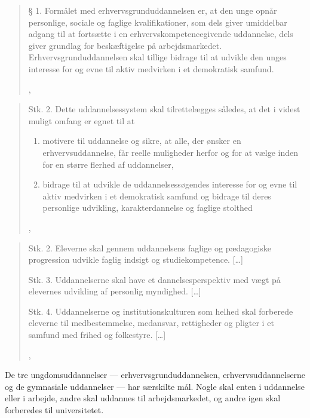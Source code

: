 \blockquote[,  \cite{uddannelsesministerietBekendtgorelseAfLov2016a}]{
§ 1. Formålet med erhvervsgrunduddannelsen er, at den unge opnår personlige, sociale og faglige kvalifikationer, som dels giver umiddelbar adgang til at fortsætte i en erhvervskompetencegivende uddannelse, dels giver grundlag for beskæftigelse på arbejdsmarkedet. 
Erhvervsgrunduddannelsen skal tillige bidrage til at udvikle den unges interesse for og evne til aktiv medvirken i et demokratisk samfund.
}
\blockquote[,  \cite{uddannelsesministerietBekendtgorelseAfLov2020}]{
Stk. 2. Dette uddannelsessystem skal tilrettelægges således, at det i videst muligt omfang er egnet til at
\begin{enumerate}
  \item
    motivere til uddannelse og sikre, at alle, der ønsker en erhvervsuddannelse, får reelle muligheder herfor og for at vælge inden for en større flerhed af uddannelser, \textins[\ldots]

  \item
    bidrage til at udvikle de uddannelsessøgendes interesse for og evne til aktiv medvirken i et demokratisk samfund og bidrage til deres personlige udvikling, karakterdannelse og faglige stolthed \textins[\ldots]
\end{enumerate}
}
\blockquote[, \cite{uddannelsesministerietBekendtgorelseAfLov2019}]{

  Stk. 2. Eleverne skal gennem uddannelsens faglige og pædagogiske progression udvikle faglig indsigt og studiekompetence. [\ldots]

  Stk. 3. Uddannelserne skal have et dannelsesperspektiv med vægt på elevernes udvikling af personlig myndighed. [\ldots]

  Stk. 4. Uddannelserne og institutionskulturen som helhed skal forberede eleverne til medbestemmelse, medansvar, rettigheder og pligter i et samfund med frihed og folkestyre. [\ldots]
}

De tre ungdomsuddannelser --- erhvervsgrunduddannelsen, erhvervsuddannelserne og de gymnasiale uddannelser —  har særskilte mål. Nogle skal enten i uddannelse eller i arbejde, andre skal uddannes til arbejdsmarkedet, og andre igen skal forberedes til universitetet.


